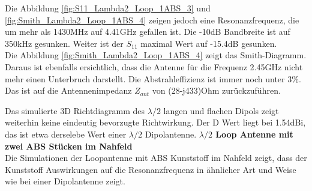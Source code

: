 Die Abbildung \ref{fig:S11_Lambda2_Loop_1ABS_3} und \ref{fig:Smith_Lambda2_Loop_1ABS_4} zeigen jedoch eine Resonanzfrequenz, die um mehr als 1430MHz auf 4.41GHz gefallen ist. Die -10dB Bandbreite ist auf 350kHz gesunken. Weiter ist der $S_{11}$ maximal Wert auf -15.4dB gesunken.\\
Die Abbildung \ref{fig:Smith_Lambda2_Loop_1ABS_4} zeigt das Smith-Diagramm. Daraus ist ebenfalls ersichtlich, dass die Antenne für die Frequenz 2.45GHz nicht mehr einen Unterbruch darstellt. Die Abstrahleffizienz ist immer noch unter $3\%$. Das ist auf die Antennenimpedanz $Z_{ant}$ von (28-j433)Ohm zurückzuführen.


Das simulierte 3D Richtdiagramm des $\lambda/2$ langen und flachen Dipols zeigt weiterhin keine eindeutig bevorzugte Richtwirkung. Der D Wert liegt bei 1.54dBi, das ist etwa derselebe Wert einer $\lambda/2$ Dipolantenne. 
\newpage
\textbf{$\lambda/2$ Loop Antenne mit zwei ABS Stücken im Nahfeld}\\
Die Simulationen der Loopantenne mit ABS Kunststoff im Nahfeld  zeigt, dass der Kunststoff  Auswirkungen auf die Resonanzfrequenz in ähnlicher Art und Weise wie bei einer Dipolantenne zeigt.\\

